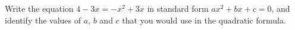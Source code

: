 Write the equation $4-3x=-x^2+3x$ in standard form $ax^2+bx+c=0$, and identify the values of $a$, $b$ and $c$ that you would use in the quadratic formula.
